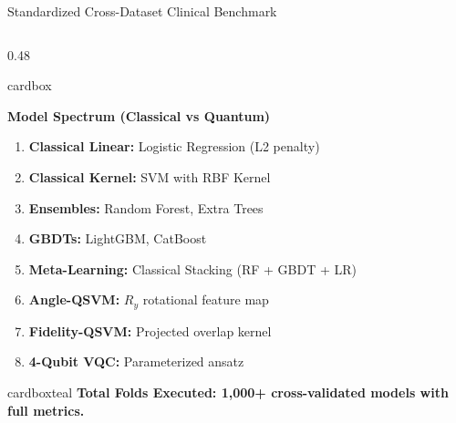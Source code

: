\documentclass[aspectratio=169, 10pt]{beamer}
\newcommand{\cardbox}[3]{%
  \begin{beamercolorbox}[wd=\linewidth,rounded=true,sep=2.5pt]{cardbox}%
    {\bfseries\scriptsize\color{#1}#2\par}\vspace*{1pt}%
    {\footnotesize #3}%
  \end{beamercolorbox}%
}
\begin{document}
\begin{frame}{Standardized Cross-Dataset Clinical Benchmark}
\begin{columns}[T]
    \begin{column}{0.48\textwidth}
      \cardbox{TealAccent}{Model Spectrum (Classical vs Quantum)}{
        \begin{enumerate}\setlength\itemsep{1pt}\scriptsize
          \item \textbf{Classical Linear:} Logistic Regression (L2 penalty)
          \item \textbf{Classical Kernel:} SVM with RBF Kernel
          \item \textbf{Ensembles:} Random Forest, Extra Trees
          \item \textbf{GBDTs:} LightGBM, CatBoost
          \item \textbf{Meta-Learning:} Classical Stacking (RF + GBDT + LR)
          \item \textbf{Angle-QSVM:} $R_y$ rotational feature map
          \item \textbf{Fidelity-QSVM:} Projected overlap kernel
          \item \textbf{4-Qubit VQC:} Parameterized ansatz
        \end{enumerate}
      }
      \vspace*{3pt}
      \begin{beamercolorbox}[wd=\linewidth,rounded=true,center,sep=2pt]{cardboxteal}
        {\tiny\bfseries\color{TealAccent} Total Folds Executed: 1,000+ cross-validated models with full metrics.}
      \end{beamercolorbox}
    \end{column}
  \end{columns}
\end{frame}
\end{document}
